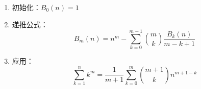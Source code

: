 \begin{enumerate}
	\item 初始化：$B_0(n) = 1$
	\item 递推公式：
	\[B_m(n) = n^m - \sum_{k = 0}^{m - 1}\binom{m}{k} \frac{B_k(n)}{m - k + 1}\]
	\item 应用：
	\[\sum_{k = 1}^{n} k^m = \frac{1}{m + 1}\sum_{k = 0}^{m}\binom{m + 1}{k}n^{m + 1 - k}\]
\end{enumerate}

